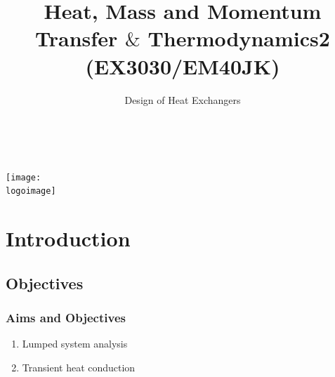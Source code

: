\documentclass[10pt,compress]{beamer}
\institute{School of Engineering}
\title{Heat, Mass and Momentum Transfer $\&$ Thermodynamics2 (EX3030/EM40JK)}
\subtitle{Design of Heat Exchangers}
\date[ ]{ }
\author[\shortname]{%
  \fullname\\\ttfamily{\emailaddress}
}
\newcommand{\logoimage}{../FigBanner/UoAHorizBanner}
\begin{document}
\begin{frame}
  \titlepage
  \vfill%
  \begin{center}
    \texttt{[image: \\logoimage]}
  \end{center}
\end{frame}




\section{Introduction} 


\subsection{Objectives}

\begin{frame}
 \frametitle{Aims and Objectives}
   \begin{enumerate}
     \item Lumped system analysis
     \item Transient heat conduction
   \end{enumerate}
\end{frame}
\end{document}
